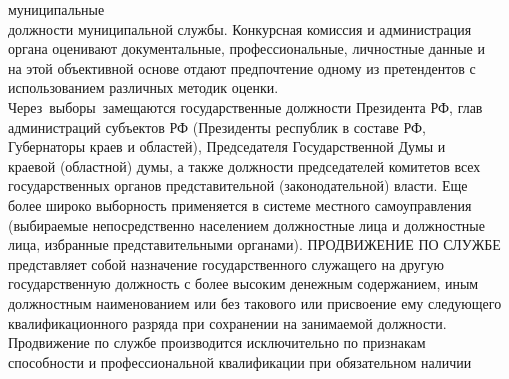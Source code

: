 \documentclass[14pt,a4paper]{extarticle}
\begin{document}
муниципальные \\   \vspace{1em} должности муниципальной службы. Конкурсная комиссия и
администрация \\   \vspace{1em} органа оценивают документальные, профессиональные, личностные данные
и \\   \vspace{1em} на этой объективной основе отдают предпочтение одному из претендентов
с \\   \vspace{1em} использованием различных методик оценки. \\   \vspace{1em} Через выборы замещаются государственные должности Президента РФ,
глав \\   \vspace{1em} администраций субъектов РФ (Президенты республик в составе РФ, \\   \vspace{1em} Губернаторы краев и областей), Председателя Государственной Думы
и \\   \vspace{1em} краевой (областной) думы, а также должности председателей комитетов
всех \\   \vspace{1em} государственных органов представительной (законодательной) власти.
Еще \\   \vspace{1em} более широко выборность применяется в системе местного
самоуправления \\   \vspace{1em} (выбираемые непосредственно населением должностные лица и
должностные \\   \vspace{1em} лица, избранные представительными органами). ПРОДВИЖЕНИЕ ПО
СЛУЖБЕ \\   \vspace{1em} представляет собой назначение государственного служащего на
другую \\   \vspace{1em} государственную должность с более высоким денежным содержанием,
иным \\   \vspace{1em} должностным наименованием или без такового или присвоение ему
следующего \\   \vspace{1em} квалификационного разряда при сохранении на занимаемой должности. \\   \vspace{1em} Продвижение по службе производится исключительно по признакам \\   \vspace{1em} способности и профессиональной квалификации при обязательном наличии
\end{document}
